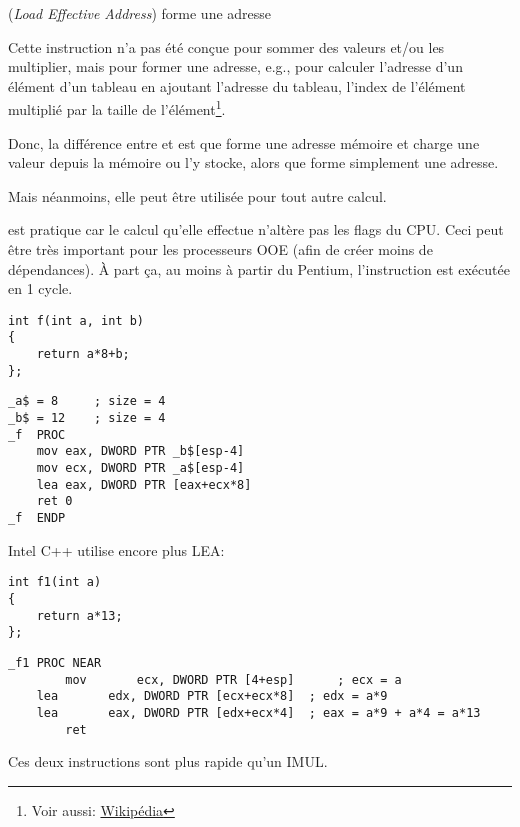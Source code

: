 \item[LEA] (\emph{Load Effective Address}) forme une adresse

\label{sec:LEA}

\newcommand{\URLAM}{\href{http://go.yurichev.com/17109}{Wikipédia}}

Cette instruction n'a pas été conçue pour sommer des valeurs et/ou les multiplier,
mais pour former une adresse, e.g., pour calculer l'adresse d'un élément d'un tableau
en ajoutant l'adresse du tableau, l'index de l'élément multiplié par la taille de
l'élément\footnote{Voir aussi: \URLAM}.
\par
Donc, la différence entre \MOV et \LEA est que \MOV forme une adresse mémoire et
charge une valeur depuis la mémoire ou l'y stocke, alors que \LEA forme simplement une adresse.
\par
Mais néanmoins, elle peut être utilisée pour tout autre calcul.
\par
\LEA est pratique car le calcul qu'elle effectue n'altère pas les flags du \ac{CPU}.
Ceci peut être très important pour les processeurs \ac{OOE} (afin de créer moins de dépendances).
À part ça, au moins à partir du Pentium, l'instruction \LEA est exécutée en 1 cycle.

\begin{lstlisting}[style=customc]
int f(int a, int b)
{
	return a*8+b;
};
\end{lstlisting}

\begin{lstlisting}[caption=MSVC 2010 \Optimizing,style=customasmx86]
_a$ = 8		; size = 4
_b$ = 12	; size = 4
_f	PROC
	mov	eax, DWORD PTR _b$[esp-4]
	mov	ecx, DWORD PTR _a$[esp-4]
	lea	eax, DWORD PTR [eax+ecx*8]
	ret	0
_f	ENDP
\end{lstlisting}

Intel C++ utilise encore plus LEA:

\begin{lstlisting}[style=customc]
int f1(int a)
{
	return a*13;
};
\end{lstlisting}

\begin{lstlisting}[caption=Intel C++ 2011,style=customasmx86]
_f1	PROC NEAR
        mov       ecx, DWORD PTR [4+esp]      ; ecx = a
	lea       edx, DWORD PTR [ecx+ecx*8]  ; edx = a*9
	lea       eax, DWORD PTR [edx+ecx*4]  ; eax = a*9 + a*4 = a*13
        ret
\end{lstlisting}

Ces deux instructions sont plus rapide qu'un IMUL.


